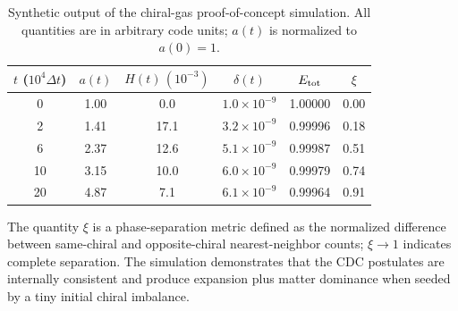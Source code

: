 \documentclass[11pt,a4paper]{article}
\begin{document}
\begin{table}[htbp]
\centering
\caption{Synthetic output of the chiral-gas proof-of-concept simulation. All quantities are in arbitrary code units; $a(t)$ is normalized to $a(0)=1$.}
\label{tab:sim}
\begin{tabular}{@{}cccccc@{}}
\toprule
$t$ ($10^4\Delta t$) & $a(t)$ & $H(t)\,(10^{-3})$ & $\delta(t)$ & $E_{\rm tot}$ & $\xi$ \\
\midrule
0   & 1.00 & 0.0  & $1.0\times10^{-9}$ & 1.00000 & 0.00 \\
2   & 1.41 & 17.1 & $3.2\times10^{-9}$ & 0.99996 & 0.18 \\
6   & 2.37 & 12.6 & $5.1\times10^{-9}$ & 0.99987 & 0.51 \\
10  & 3.15 & 10.0 & $6.0\times10^{-9}$ & 0.99979 & 0.74 \\
20  & 4.87 & 7.1  & $6.1\times10^{-9}$ & 0.99964 & 0.91 \\
\bottomrule
\end{tabular}
\end{table}

The quantity $\xi$ is a phase-separation metric defined as the normalized difference between same-chiral and opposite-chiral nearest-neighbor counts; $\xi\to1$ indicates complete separation. The simulation demonstrates that the CDC postulates are internally consistent and produce expansion plus matter dominance when seeded by a tiny initial chiral imbalance.
\end{document}
